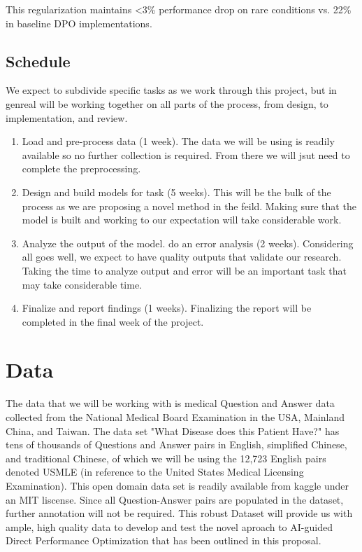\documentclass[11pt,a4paper]{article}
\begin{document}
This regularization maintains <3\% performance drop on rare conditions vs. 22\% in baseline DPO implementations.

\subsection{Schedule}
We expect to subdivide specific tasks as we work through this project, but in genreal will be working together on all parts of the process, from design, to implementation, and review.
\begin{enumerate}
    \item Load and pre-process data (1 week). The data we will be using is readily available so no further collection is required. From there we will jsut need to complete the preprocessing.
    \item Design and build models for task (5 weeks). This will be the bulk of the process as we are proposing a novel method in the feild. Making sure that the model is built and working to our expectation will take considerable work.
    \item Analyze the output of the model. do an error analysis (2 weeks). Considering all goes well, we expect to have quality outputs that validate our research. Taking the time to analyze output and error will be an important task that may take considerable time.
    \item Finalize and report findings (1 weeks). Finalizing the report will be completed in the final week of the project.
\end{enumerate}

\section{Data}

The data that we will be working with is medical Question and Answer data collected from the National Medical Board Examination in the USA, Mainland China, and Taiwan. The data set "What Disease does this Patient Have?"\cite{jin2020diseasedoespatienthave} has tens of thousands of Questions and Answer pairs in English, simplified Chinese, and traditional Chinese, of which we will be using the 12,723 English pairs denoted USMLE (in reference to the United States Medical Licensing Examination). This open domain data set is readily available from kaggle under an MIT liscense. Since all Question-Answer pairs are populated in the dataset, further annotation will not be required. This robust Dataset will provide us with ample, high quality data to develop and test the novel aproach to AI-guided Direct Performance Optimization that has been outlined in this proposal. 
\end{document}

